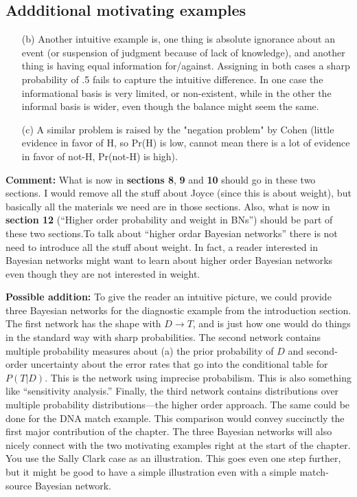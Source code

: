 \documentclass[
  10pt,
  dvipsnames,enabledeprecatedfontcommands]{scrartcl}
\begin{document}
\hypertarget{addditional-motivating-examples}{%
\subsection{Addditional motivating
examples}\label{addditional-motivating-examples}}

\begin{itemize}

\item[(b)] Another intuitive example is, one thing is absolute ignorance about an event (or suspension of judgment because of lack of knowledge), and another thing is having equal information for/against. Assigning in both cases a sharp probability of .5 fails to capture the intuitive difference. In one case the informational basis is very limited, or non-existent, while in the other the informal basis is wider, even though the balance might seem the same. 

\item[(c)] A similar problem is raised by the "negation problem" by Cohen (little evidence in favor of H, so Pr(H) is low, cannot mean there is a lot of evidence in favor of not-H, Pr(not-H) is high). 

\end{itemize}

\textbf{Comment:} What is now in \textbf{sections 8}, \textbf{9} and
\textbf{10} should go in these two sections. I would remove all the
stuff about Joyce (since this is about weight), but basically all the
materials we need are in those sections. Also, what is now in
\textbf{section 12} (``Higher order probability and weight in BNs'')
should be part of these two sections.To talk about ``higher ordar
Bayesian networks'' there is not need to introduce all the stuff about
weight. In fact, a reader interested in Bayesian networks might want to
learn about higher order Bayesian networks even though they are not
interested in weight.

\textbf{Possible addition:} To give the reader an intuitive picture, we
could provide three Bayesian networks for the diagnostic example from
the introduction section. The first network has the shape with
\(D \rightarrow T\), and is just how one would do things in the standard
way with sharp probabilities. The second network contains multiple
probability measures about (a) the prior probability of \(D\) and
second-order uncertainty about the error rates that go into the
conditional table for \(P(T | D)\). This is the network using imprecise
probabilism. This is also something like ``sensitivity analysis.''
Finally, the third network contains distributions over multiple
probability distributions---the higher order approach. The same could be
done for the DNA match example. This comparison would convey succinctly
the first major contribution of the chapter. The three Bayesian networks
will also nicely connect with the two motivating examples right at the
start of the chapter. You use the Sally Clark case as an illustration.
This goes even one step further, but it might be good to have a simple
illustration even with a simple match-source Bayesian network.
\end{document}
